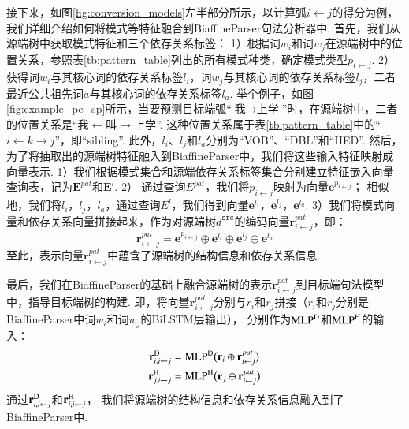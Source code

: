 接下来，如图\ref{fig:conversion_models}左半部分所示，以计算弧$i \leftarrow j$的得分为例，我们详细介绍如何将模式等特征融合到BiaffineParser句法分析器中.
首先，我们从源端树中获取模式特征和三个依存关系标签：
1）根据词$w_i$和词$w_j$在源端树中的位置关系，参照表\ref{tb:pattern_table}列出的所有模式种类，确定模式类型$p_{i \leftarrow j}$.
2）获得词$w_i$与其核心词的依存关系标签$l_i$，词$w_j$与其核心词的依存关系标签$l_j$，二者最近公共祖先词$a$与其核心词的依存关系标签$l_a$.
举个例子，如图\ref{fig:example_pe_sp}所示，当要预测目标端弧“$\mbox{我}\rightarrow \mbox{上学}$”时，在源端树中，二者的位置关系是“$\mbox{我} \leftarrow \mbox{叫} \rightarrow \mbox{上学}$”. 这种位置关系属于表\ref{tb:pattern_table}中的“$i \leftarrow k \rightarrow j$”，即“sibling”. 此外，$l_i$、$l_j$和$l_a$分别为“VOB”、“DBL”和“HED”.
然后，为了将抽取出的源端树特征融入到BiaffineParser中，我们将这些输入特征映射成向量表示.
1）我们根据模式集合和源端依存关系标签集合分别建立特征嵌入向量查询表，记为$\mathbf{E}^{pat}$和$\mathbf{E}^{l}$.
2） 通过查询$E^{pat}$，我们将$p_{i \leftarrow j}$映射为向量$\mathbf{e}^{p_{i \leftarrow j}}$；
相似地，我们将$l_i$，$l_j$，$l_a$，通过查询$E^{l}$，我们得到向量$\mathbf{e}^{l_i}$，$\mathbf{e}^{l_j}$，$\mathbf{e}^{l_a}$.
3）我们将模式向量和依存关系向量拼接起来，作为对源端树$d^{\texttt{src}}$的编码向量$\mathbf{r}^{pat}_{i \leftarrow j}$，即：
\begin{equation}\label{eq:pattern}
    \mathbf{r}^{pat}_{i \leftarrow j} = \mathbf{e}^{p_{i \leftarrow j}} \oplus \mathbf{e}^{l_i} \oplus
    \mathbf{e}^{l_j} \oplus \mathbf{e}^{l_a}
\end{equation}
至此，表示向量$\mathbf{r}^{pat}_{i \leftarrow j}$中蕴含了源端树的结构信息和依存关系信息.

最后，我们在BiaffineParser的基础上融合源端树的表示$\mathbf{r}^{pat}_{i \leftarrow j}$到目标端句法模型中，指导目标端树的构建.
即，将向量$\mathbf{r}^{pat}_{i \leftarrow j}$分别与$r_i$和$r_j$拼接（$r_i$和$r_j$分别是BiaffineParser中词$w_i$和词$w_j$的BiLSTM层输出），
分别作为$\textup{MLP}^\textup{D}$和$\textup{MLP}^\textup{H}$的输入：
\begin{equation}\label{eq:pattern}
    \begin{split}
        \mathbf{r}_{i,i \leftarrow j}^{\textup{D}} &={\textup{MLP}}^{\textup{D}} \big(\mathbf{r}_i \oplus \mathbf{r}^{pat}_{i  \leftarrow j} \big)  \\
        \mathbf{r}_{j,i\leftarrow j}^{\textup{H}} &= {\textup{MLP}}^{\textup{H}} \big(\mathbf{r}_j \oplus \mathbf{r}^{pat}_{i \leftarrow j} \big)
    \end{split}
\end{equation}
通过$\mathbf{r}_{i,i \leftarrow j}^{\textup{D}}$和$\mathbf{r}_{i,i \leftarrow j}^{\textup{H}}$，
我们将源端树的结构信息和依存关系信息融入到了BiaffineParser中.

